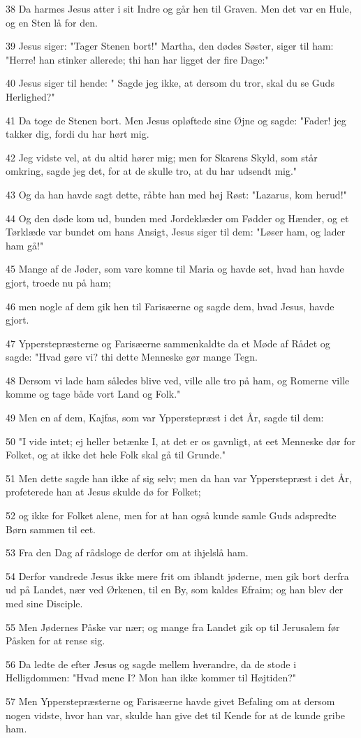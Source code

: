 \par 38 Da harmes Jesus atter i sit Indre og går hen til Graven. Men det var en Hule, og en Sten lå for den.
\par 39 Jesus siger: "Tager Stenen bort!" Martha, den dødes Søster, siger til ham: "Herre! han stinker allerede; thi han har ligget der fire Dage:"
\par 40 Jesus siger til hende: " Sagde jeg ikke, at dersom du tror, skal du se Guds Herlighed?"
\par 41 Da toge de Stenen bort. Men Jesus opløftede sine Øjne og sagde: "Fader! jeg takker dig, fordi du har hørt mig.
\par 42 Jeg vidste vel, at du altid hører mig; men for Skarens Skyld, som står omkring, sagde jeg det, for at de skulle tro, at du har udsendt mig."
\par 43 Og da han havde sagt dette, råbte han med høj Røst: "Lazarus, kom herud!"
\par 44 Og den døde kom ud, bunden med Jordeklæder om Fødder og Hænder, og et Tørklæde var bundet om hans Ansigt, Jesus siger til dem: "Løser ham, og lader ham gå!"
\par 45 Mange af de Jøder, som vare komne til Maria og havde set, hvad han havde gjort, troede nu på ham;
\par 46 men nogle af dem gik hen til Farisæerne og sagde dem, hvad Jesus, havde gjort.
\par 47 Ypperstepræsterne og Farisæerne sammenkaldte da et Møde af Rådet og sagde: "Hvad gøre vi? thi dette Menneske gør mange Tegn.
\par 48 Dersom vi lade ham således blive ved, ville alle tro på ham, og Romerne ville komme og tage både vort Land og Folk."
\par 49 Men en af dem, Kajfas, som var Ypperstepræst i det År, sagde til dem:
\par 50 "I vide intet; ej heller betænke I, at det er os gavnligt, at eet Menneske dør for Folket, og at ikke det hele Folk skal gå til Grunde."
\par 51 Men dette sagde han ikke af sig selv; men da han var Ypperstepræst i det År, profeterede han at Jesus skulde dø for Folket;
\par 52 og ikke for Folket alene, men for at han også kunde samle Guds adspredte Børn sammen til eet.
\par 53 Fra den Dag af rådsloge de derfor om at ihjelslå ham.
\par 54 Derfor vandrede Jesus ikke mere frit om iblandt jøderne, men gik bort derfra ud på Landet, nær ved Ørkenen, til en By, som kaldes Efraim; og han blev der med sine Disciple.
\par 55 Men Jødernes Påske var nær; og mange fra Landet gik op til Jerusalem før Påsken for at rense sig.
\par 56 Da ledte de efter Jesus og sagde mellem hverandre, da de stode i Helligdommen: "Hvad mene I? Mon han ikke kommer til Højtiden?"
\par 57 Men Ypperstepræsterne og Farisæerne havde givet Befaling om at dersom nogen vidste, hvor han var, skulde han give det til Kende for at de kunde gribe ham.

